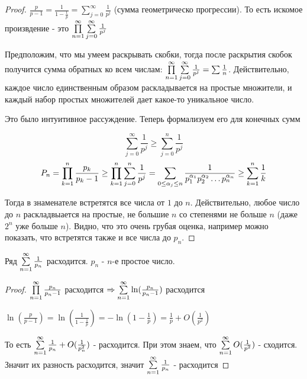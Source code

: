 \begin{proof}
    $\frac{p}{p-1} = \frac{1}{1-\frac{1}{p}} = \sum \limits_{j=0}^\infty \frac{1}{p^j}$ (сумма геометрическо прогрессии).
    То есть искомое произвдение - это $\prod \limits_{n=1}^\infty \sum \limits_{j=0}^\infty \frac{1}{p^j}$
    
    Предположим, что мы умеем раскрывать скобки, тогда после раскрытия скобок получится сумма обратных ко всем числам:
    $\prod \limits_{n=1}^\infty \sum \limits_{j=0}^\infty \frac{1}{p^j} = \sum \frac{1}{n}$.
    Действительно, каждое число единственным образом раскладывается на простые множители, и каждый набор простых множителей дает какое-то уникальное число.

    Это было интуитивное рассуждение. Теперь формализуем его для конечных сумм

    \[\sum \limits_{j=0}^\infty \frac{1}{p^j} \geq \sum \limits_{j=0}^n \frac{1}{p^j}\]
    \[P_n = \prod \limits_{k=1}^n \frac{p_k}{p_k - 1} \geq \prod \limits_{k=1}^n \sum \limits_{j=0}^n \frac{1}{p^j} = 
    \sum_{0 \leq \alpha_j \leq n} \frac{1}{p_1^{\alpha_1}p_2^{\alpha_2}\ldots p_n^{\alpha_n}} \geq \sum \limits_{k=1}^n \frac{1}{k} \]

    Тогда в знаменателе встретятся все числа от $1$ до $n$. Действительно, любое число до $n$ раскладвыается на простые,
    не большие $n$ со степенями не больше $n$ (даже $2^n$ уже больше $n$). Видно, что это очень грубая оценка, например можно
    показать, что встретятся также и все числа до $p_n$.
\end{proof}

\begin{theorem}
    Ряд $\sum \limits_{n=1}^\infty \frac{1}{p_n}$ расходится. $p_n$ - $n$-е простое число.
\end{theorem}

\begin{proof}
    $\prod \limits_{n=1}^\infty \frac{p_n}{p_n - 1}$ расходится $\Rightarrow \sum \limits_{n=1}^\infty \ln(\frac{p_n}{p_n-1})$ расходится

    $\ln(\frac{p}{p-1}) = \ln(\frac{1}{1-\frac{1}{p}}) = -\ln(1 - \frac{1}{p}) = \frac{1}{p} + O(\frac{1}{p^2})$

    То есть $\sum \limits_{n=1}^\infty \frac{1}{p_n} + O(\frac{1}{p_n^2})$ - расходится. При этом знаем, что $\sum \limits_{n=1}^\infty O(\frac{1}{p^2})$ - сходится.
    Значит их разность расходится, значит $\sum \limits_{n=1}^\infty \frac{1}{p_n}$ - расходится
\end{proof}

